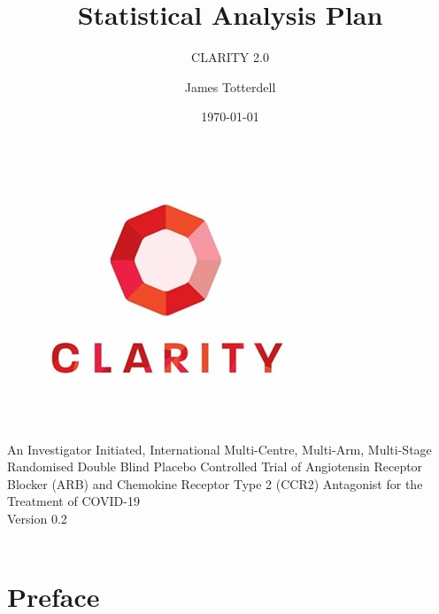 \documentclass[11pt,parskip=half-]{scrartcl}
\begin{document}
\title{Statistical Analysis Plan}
\subtitle{CLARITY 2.0}
\author{James Totterdell}
\date{\today}
\makeatletter
\begin{titlepage}
    \begin{center}
        \includegraphics[width=0.7\linewidth]{clarity-logo.jpg}\\[4ex]
        {\huge \bfseries  \@title }\\[2ex]
        {\LARGE \bfseries  \@subtitle }\\[2ex]
        {\large An Investigator Initiated, International Multi-Centre, Multi-Arm, Multi-Stage
        Randomised Double Blind Placebo Controlled Trial of Angiotensin Receptor
        Blocker (ARB) and Chemokine Receptor Type 2 (CCR2) Antagonist for the Treatment
        of COVID-19}\\[2ex]
        {\LARGE Version 0.2}\\[2ex]
        {\LARGE \@date}\\[10ex]
    \end{center}
\end{titlepage}
\makeatother
\thispagestyle{empty}
\newpage

\tableofcontents

\clearpage

\section*{Preface}
\end{document}
